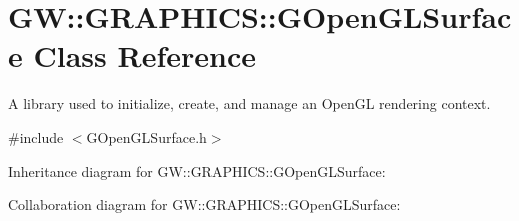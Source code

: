 \hypertarget{classGW_1_1GRAPHICS_1_1GOpenGLSurface}{}\section{GW\+:\+:G\+R\+A\+P\+H\+I\+CS\+:\+:G\+Open\+G\+L\+Surface Class Reference}
\label{classGW_1_1GRAPHICS_1_1GOpenGLSurface}


A library used to initialize, create, and manage an Open\+GL rendering context.  




{\ttfamily \#include $<$G\+Open\+G\+L\+Surface.\+h$>$}



Inheritance diagram for GW\+:\+:G\+R\+A\+P\+H\+I\+CS\+:\+:G\+Open\+G\+L\+Surface\+:


Collaboration diagram for GW\+:\+:G\+R\+A\+P\+H\+I\+CS\+:\+:G\+Open\+G\+L\+Surface\+:
